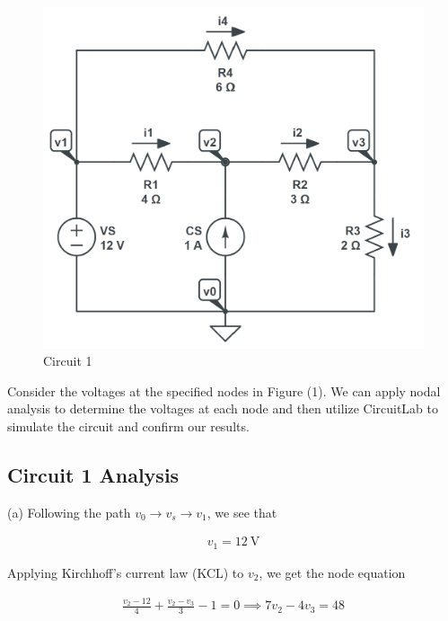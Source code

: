 \documentclass[12pt]{article}
\begin{document}
\begin{figure}[H]
    \begin{center}
        \includegraphics[scale=0.6]{circuit-1.png}
        \caption { Circuit 1}
    \end{center}
\end{figure}

Consider the voltages at the specified nodes in Figure (1). We can apply nodal analysis to determine the voltages at each node and then utilize CircuitLab to simulate the circuit and confirm our results.

\subsection{Circuit 1 Analysis}

(a) Following the path $ v_0 \rightarrow v_s \rightarrow v_1$, we see that 

\begin{equation}
    \begin{split}
        v_1 = \SI{12}{\volt}
    \end{split}
\end{equation}

Applying Kirchhoff's current law (KCL) to $v_2$, we get the node equation

\begin{equation}
    \begin{split}
        \frac{v_2 - 12}{4} + \frac{v_2 - v_3}{3} - 1 = 0 \implies 7v_2 - 4v_3 = 48
    \end{split}
\end{equation}
\end{document}
